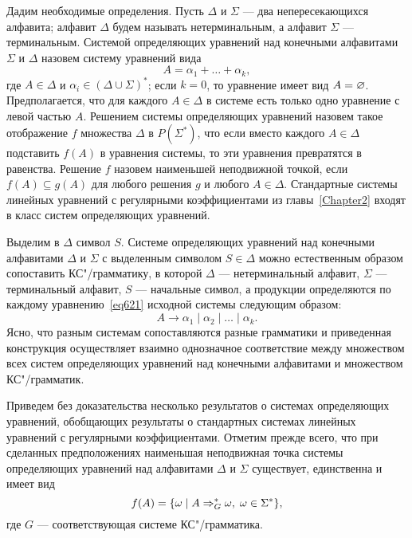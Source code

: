 Дадим необходимые определения. Пусть $\Delta$ и $\Sigma$ --- два
непересекающихся алфавита; алфавит $\Delta$ будем называть
нетерминальным, а алфавит $\Sigma$ --- терминальным. Системой
определяющих уравнений над конечными алфавитами $\Sigma$ и $\Delta$
назовем систему уравнений вида
\begin{equation}
\label{eq621}
A = \alpha_1 + \ldots + \alpha_k, %
\end{equation}
где $A\in\Delta$ и $\alpha_i\in(\Delta\cup\Sigma)^*$; если $k=0$, то
уравнение имеет вид $A=\varnothing$. Предполагается, что для каждого
$A\in\Delta$ в системе есть только одно уравнение с левой частью $A$.
Решением системы определяющих уравнений назовем такое отображение $f$
множества $\Delta$ в $P(\Sigma^*)$, что если вместо каждого
$A\in\Delta$ подставить $f(A)$ в уравнения системы, то эти уравнения
превратятся в равенства. Решение $f$ назовем наименьшей неподвижной
точкой, если $f(A)\subseteq g(A)$ для любого решения $g$ и любого
$A\in\Delta$. Стандартные системы линейных уравнений с регулярными
коэффициентами из главы~\ref{Chapter2} входят в класс систем определяющих уравнений.

Выделим в $\Delta$ символ $S$. Системе определяющих уравнений над
конечными алфавитами $\Delta$ и $\Sigma$ с выделенным символом
$S\in\Delta$ можно естественным образом сопоставить КС"/грамматику, в
которой $\Delta$ --- нетерминальный алфавит, $\Sigma$ --- терминальный
алфавит, $S$ --- начальные символ, а продукции определяются по каждому
уравнению~\eqref{eq621} исходной системы следующим образом:
\begin{equation}
\label{eq622}
    A \to  \alpha_1 \mid \alpha_2 \mid \ldots \mid \alpha_k.
\end{equation}
Ясно, что разным системам сопоставляются разные грамматики и
приведенная конструкция осуществляет взаимно однозначное соответствие
между множеством всех систем определяющих уравнений над конечными
алфавитами и множеством КС"/грамматик.

Приведем без доказательства несколько результатов о системах
определяющих уравнений, обобщающих результаты о стандартных системах
линейных уравнений с регулярными коэффициентами. Отметим прежде
всего, что при сделанных предположениях наименьшая неподвижная
точка системы определяющих уравнений над алфавитами $\Delta$
и $\Sigma$ существует, единственна и имеет вид
\[
    f(A) = \{\omega\mid A \Rightarrow_G^* \omega, \; \omega\in\Sigma^*\},
\]
где $G$ --- соответствующая системе КС"/грамматика.

